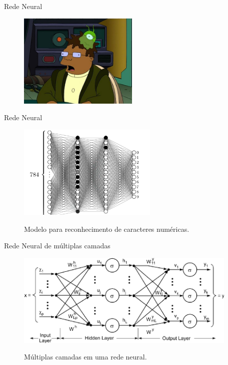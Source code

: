 \documentclass[compress]{beamer}
\begin{document}
\begin{frame}{Rede Neural}
    \begin{figure}[h]
        \includegraphics[height=4.5cm]{img/Brainslug.jpg}
    \end{figure}
\end{frame}

\begin{frame}{Rede Neural}
    \begin{figure}[h]
        \includegraphics[height=4.5cm]{img/network.png}
        
        Modelo para reconhecimento de caracteres numéricas\cite{BibEntry2018Jun}.
    \end{figure}
\end{frame}

\begin{frame}{Rede Neural de múltiplas camadas}
    \begin{figure}[h]
        \includegraphics[height=4.5cm]{img/multilayer.png}
        
        Múltiplas camadas em uma rede neural\cite{BibEntry2018Jun2}.
    \end{figure}
\end{frame}
\end{document}

